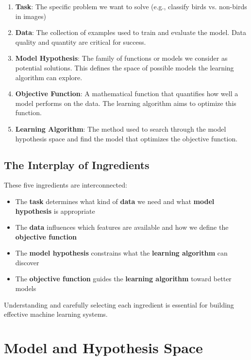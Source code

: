 \documentclass[11pt,a4paper]{article}
\theoremstyle{definition}
\theoremstyle{plain}
\theoremstyle{remark}
\begin{document}
\begin{enumerate}
    \item \textbf{Task}: The specific problem we want to solve (e.g., classify birds vs. non-birds in images)
    
    \item \textbf{Data}: The collection of examples used to train and evaluate the model. Data quality and quantity are critical for success.
    
    \item \textbf{Model Hypothesis}: The family of functions or models we consider as potential solutions. This defines the space of possible models the learning algorithm can explore.
    
    \item \textbf{Objective Function}: A mathematical function that quantifies how well a model performs on the data. The learning algorithm aims to optimize this function.
    
    \item \textbf{Learning Algorithm}: The method used to search through the model hypothesis space and find the model that optimizes the objective function.
\end{enumerate}

\subsection{The Interplay of Ingredients}

These five ingredients are interconnected:
\begin{itemize}
    \item The \textbf{task} determines what kind of \textbf{data} we need and what \textbf{model hypothesis} is appropriate
    \item The \textbf{data} influences which features are available and how we define the \textbf{objective function}
    \item The \textbf{model hypothesis} constrains what the \textbf{learning algorithm} can discover
    \item The \textbf{objective function} guides the \textbf{learning algorithm} toward better models
\end{itemize}

Understanding and carefully selecting each ingredient is essential for building effective machine learning systems.

\section{Model and Hypothesis Space}
\end{document}
